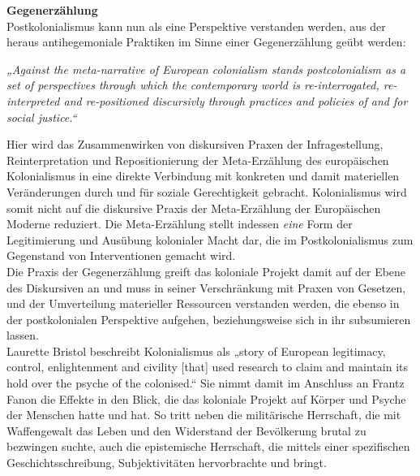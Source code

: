 \noindent\textbf{\large Gegenerzählung}\\
Postkolonialismus kann nun als eine Perspektive verstanden werden, aus der
heraus antihegemoniale Praktiken im Sinne einer Gegenerzählung geübt werden:
\begin{myenv}
  \textit{„Against the meta-narrative of European colonialism stands
  postcolonialism as a set of perspectives through which the contemporary world
is re-interrogated, re-interpreted and re-positioned discursivly through
practices and policies of and for social justice.“\footnotemark
{}}
\end{myenv}
Hier wird das Zusammenwirken von diskursiven Praxen der Infragestellung,
Reinterpretation und Repositionierung der Meta-Erzählung des europäischen
Kolonialismus in eine direkte Verbindung mit konkreten und damit materiellen
Veränderungen durch und für soziale Gerechtigkeit gebracht. Kolonialismus wird
somit nicht auf die diskursive Praxis der Meta-Erzählung der Europäischen
Moderne reduziert. Die Meta-Erzählung stellt indessen \textit{eine} Form der
Legitimierung und Ausübung kolonialer Macht dar, die im Postkolonialismus zum
Gegenstand von Interventionen gemacht wird.\footnotemark{}\\
Die Praxis der Gegenerzählung greift das
koloniale Projekt damit auf der Ebene des Diskursiven an und muss in seiner
Verschränkung mit Praxen von Gesetzen, und der Umverteilung materieller
Ressourcen verstanden werden, die ebenso in der postkolonialen Perspektive
aufgehen, beziehungsweise sich in ihr subsumieren lassen.\\

Laurette Bristol beschreibt Kolonialismus als „story of European legitimacy,
control, enlightenment and civility [that] used research to claim and maintain
its hold over the psyche of the colonised.“\footnotemark {} Sie nimmt damit im Anschluss an
Frantz Fanon die Effekte in den Blick, die das koloniale Projekt auf Körper und
Psyche der Menschen hatte und hat. So tritt neben die militärische Herrschaft,
die mit Waffengewalt das Leben und den Widerstand der Bevölkerung brutal zu
bezwingen suchte, auch die epistemische Herrschaft, die mittels einer
spezifischen Geschichtsschreibung, Subjektivitäten
hervorbrachte und bringt.\footnotemark{}\\

